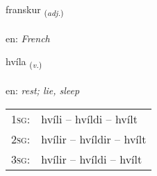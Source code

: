 \documentclass[frontgrid, backgrid]{flacards}\usepackage[]{graphicx}\usepackage[]{color}
\begin{document}
\renewcommand{\flhead}{\vskip5pt \fboxsep=0pt {\small\bfseries\footnotesize Lýsingarorð | Adjective}}
\renewcommand{\fcfoot}{\vskip5pt \fboxsep=0pt \hspace{2pt}{\small\bfseries\footnotesize 2K}}

\renewcommand{\blhead}{\vskip5pt {\small\bfseries\footnotesize Lýsingarorð | Adjective }}
\renewcommand{\bcfoot}{\vskip5pt \hspace{2pt}{\small\bfseries\footnotesize 2K}}


{franskur \small{\textsubscript{(\textit{adj.})}} \\[1ex] %
\textphonetic{[franskʏr]} \\
en: \emph{French} \\  [2ex]
\renewcommand*{\arraystretch}{0.8}
}

\renewcommand{\flhead}{\vskip5pt \fboxsep=0pt {\small\bfseries\footnotesize Sagnorð | Verb}}
\renewcommand{\fcfoot}{\vskip5pt \fboxsep=0pt \hspace{2pt}{\small\bfseries\footnotesize 2K}}

\renewcommand{\blhead}{\vskip5pt {\small\bfseries\footnotesize Sagnorð | Verb }}
\renewcommand{\bcfoot}{\vskip5pt \hspace{2pt}{\small\bfseries\footnotesize 2K}}


{hvíla \small{\textsubscript{(\textit{v.})}} \\[1ex] %
\textphonetic{[kʰviːla]} \\
en: \emph{rest; lie, sleep} \\  [2ex]
\renewcommand*{\arraystretch}{0.8}
\begin{tabular}{p{1cm}l}
\textsc{1sg}: & hvíli -- hvíldi -- hvílt \\ 
\textsc{2sg}: & hvílir -- hvíldir -- hvílt \\ 
\textsc{3sg}: & hvílir -- hvíldi -- hvílt \\ 
\end{tabular}
}
\end{document}
